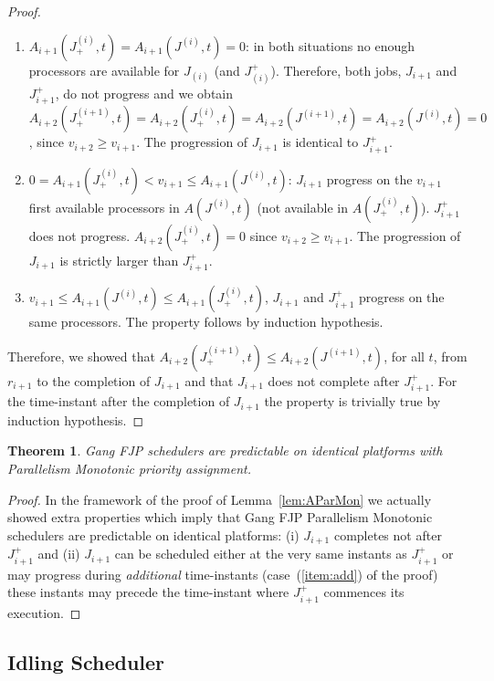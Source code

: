 \documentclass[a4paper]{article}
\newtheorem{theorem}{Theorem}
\begin{document}
\begin{proof}
\begin{enumerate}
\item $A_{i+1}(J^{(i)}_{+},t)  = A_{i+1}(J^{(i)},t) = 0$: in both situations no enough processors are available for $J_{(i)}$ (and $J_{(i)}^{+}$). Therefore, both jobs, $J_{i+1}$ and $J_{i+1}^{+}$, do not progress and we obtain $A_{i+2}(J^{(i+1)}_{+},t) = A_{i+2}(J^{(i)}_{+},t) = A_{i+2}(J^{(i+1)},t) = A_{i+2}(J^{(i)},t) = 0$, since $v_{i+2} \geq v_{i+1}$. The progression of $J_{i+1}$ is identical to $J_{i+1}^{+}$. 
\item \label{item:add} $0 = A_{i+1}(J^{(i)}_{+},t) < v_{i+1} \leq A_{i+1}(J^{(i)},t)$: $J_{i+1}$ progress on the $v_{i+1}$ first available processors in $A(J^{(i)},t)$ (not available in $A(J^{(i)}_{+},t)$). $J_{i+1}^{+}$ does not progress. $A_{i+2}(J^{(i)}_{+},t) = 0$ since $v_{i+2} \geq v_{i+1}$. The progression of $J_{i+1}$ is strictly larger than $J_{i+1}^{+}$.
\item \label{item:idem} $v_{i+1} \leq A_{i+1}(J^{(i)},t) \leq A_{i+1}(J^{(i)}_{+},t)$, $J_{i+1}$ and $J_{i+1}^{+}$ progress on the same processors. The property follows by induction hypothesis. 
\end{enumerate}
Therefore, we showed that $A_{i+2}(J^{(i+1)}_{+},t) \leq A_{i+2}(J^{(i+1)},t)$, for all $t$, from $r_{i+1}$ to the completion of $J_{i+1}$ and that $J_{i+1}$ does not complete after $J_{i+1}^{+}$. For the time-instant after the completion of $J_{i+1}$ the property is trivially true by induction hypothesis.
\end{proof}

\begin{theorem}\label{thm:predParMon} Gang FJP schedulers are predictable on identical platforms with Parallelism Monotonic priority assignment.
\end{theorem}
\begin{proof}
In the framework of the proof of Lemma~\ref{lem:AParMon} we actually showed extra properties which imply that Gang FJP Parallelism Monotonic schedulers are predictable on identical platforms: (i) $J_{i+1}$ completes not after $J_{i+1}^{+}$ and (ii) $J_{i+1}$ can be scheduled either at the very same instants as $J_{i+1}^{+}$ or may progress during \emph{additional} time-instants (case~(\ref{item:add}) of the proof) these instants may precede the time-instant where $J_{i+1}^{+}$ commences its execution.
\end{proof}

\subsection{Idling Scheduler}
\end{document}
